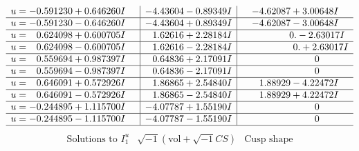 \documentclass[1p]{elsarticle_modified}
\theoremstyle{definition}
\newcommand{\I}{\sqrt{-1}}
\begin{document}
$$\begin{array}{c|c|c}
\begin{aligned}
u &= -0.591230 + 0.646260 I\end{aligned}
 & -4.43604 - 0.89349 I & -4.62087 + 3.00648 I \\ \hline\begin{aligned}
u &= -0.591230 - 0.646260 I\end{aligned}
 & -4.43604 + 0.89349 I & -4.62087 - 3.00648 I \\ \hline\begin{aligned}
u &= \phantom{-}0.624098 + 0.600705 I\end{aligned}
 & \phantom{-}1.62616 + 2.28184 I & \phantom{-0.000000 } 0. - 2.63017 I \\ \hline\begin{aligned}
u &= \phantom{-}0.624098 - 0.600705 I\end{aligned}
 & \phantom{-}1.62616 - 2.28184 I & \phantom{-0.000000 -}0. + 2.63017 I \\ \hline\begin{aligned}
u &= \phantom{-}0.559694 + 0.987397 I\end{aligned}
 & \phantom{-}0.64836 + 2.17091 I & \phantom{-0.000000 } 0 \\ \hline\begin{aligned}
u &= \phantom{-}0.559694 - 0.987397 I\end{aligned}
 & \phantom{-}0.64836 - 2.17091 I & \phantom{-0.000000 } 0 \\ \hline\begin{aligned}
u &= \phantom{-}0.646091 + 0.572926 I\end{aligned}
 & \phantom{-}1.86865 + 2.54840 I & \phantom{-}1.88929 - 4.22472 I \\ \hline\begin{aligned}
u &= \phantom{-}0.646091 - 0.572926 I\end{aligned}
 & \phantom{-}1.86865 - 2.54840 I & \phantom{-}1.88929 + 4.22472 I \\ \hline\begin{aligned}
u &= -0.244895 + 1.115700 I\end{aligned}
 & -4.07787 + 1.55190 I & \phantom{-0.000000 } 0 \\ \hline\begin{aligned}
u &= -0.244895 - 1.115700 I\end{aligned}
 & -4.07787 - 1.55190 I & \phantom{-0.000000 } 0\\
 \hline 
 \end{array}$$\newpage$$\begin{array}{c|c|c}  
\text{Solutions to }I^u_{1}& \I (\text{vol} + \sqrt{-1}CS) & \text{Cusp shape}\\

\end{array}$$
\end{document}
